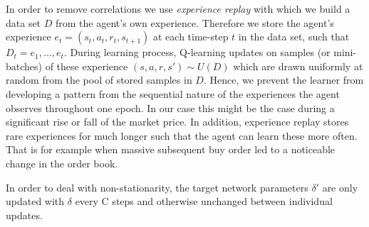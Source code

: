 In order to remove correlations we use \textit{experience replay} with which we build a data set $D$ from the agent's own experience.
Therefore we store the agent's experience $e_t=(s_t, a_t, r_t, s_{t+1})$ at each time-step $t$ in the data set, such that $D_t = {e_1, ..., e_t}$.
During learning process, Q-learning updates on samples (or mini-batches) of these experience $(s,a,r,s') \sim U(D)$ which are drawn uniformly at random from the pool of stored samples in $D$.
Hence, we prevent the learner from developing a pattern from the sequential nature of the experiences the agent observes throughout one epoch.
In our case this might be the case during a significant rise or fall of the market price.
In addition, experience replay stores rare experiences for much longer such that the agent can learn these more often.
That is for example when massive subsequent buy order led to a noticeable change in the order book.

In order to deal with non-stationarity, the target network parameters $\delta'$ are only updated with $\delta$ every C steps and otherwise unchanged between individual updates.
